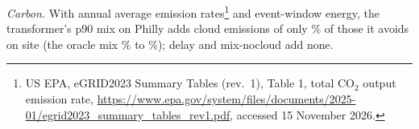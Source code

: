 \emph{Carbon.} With annual average emission rates\footnote{\raggedright US EPA, eGRID2023 Summary Tables (rev.\ 1), Table 1, total CO$_2$ output emission rate, \url{https://www.epa.gov/system/files/documents/2025-01/egrid2023_summary_tables_rev1.pdf}, accessed 15 November 2026.} and event-window energy, the transformer's p90 mix on Philly adds cloud emissions of only \EcarbonMixEastTwoAddedPct\% of those it avoids on site (the oracle mix \EcarbonOracleEastOneAddedPct\% to \EcarbonOracleEastTwoAddedPct\%); delay and mix-nocloud add none.
